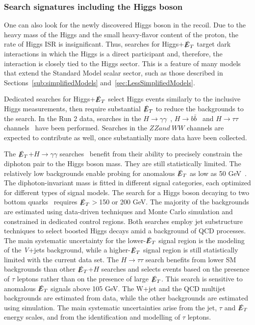 \documentclass{ar-1col}
\newcommand{\MET}{\ensuremath{\slashed{E}_T}\xspace}
\begin{document}
{\subsubsection{Search signatures including the Higgs boson}

One can also look for the newly discovered Higgs boson in the
recoil. Due to the heavy mass of the Higgs and the small
heavy-flavor content of the proton, the rate of Higgs ISR is
insignificant. Thus, searches for Higgs+\MET target dark
interactions in which the Higgs is a direct participant and,
therefore, the interaction is closely tied to the Higgs sector.
This is a feature of many models that extend the Standard Model scalar sector, 
such as those described in Sections~\ref{sub:simplifiedModels} and~\ref{sec:LessSimplifiedModels}. 

Dedicated searches for Higgs+\MET  select Higgs events similarly to
the inclusive Higgs measurements, then require substantial \MET to
reduce the backgrounds to the search. In the Run 2 data, searches
in the $H \rightarrow
\gamma\gamma$~\cite{Sirunyan:2018fpy,Aaboud:2017uak}, $H
\rightarrow b\bar{b}$~\cite{Aaboud:2017yqz,CMS-PAS-EXO-16-050} and $H \rightarrow
\tau\tau$ channels~\cite{Sirunyan:2018fpy} have been
performed. Searches in the $ZZ and~WW$ channels are
expected to contribute as well, once substantially more data have been
collected.

The \MET+$H \rightarrow \gamma\gamma$
searches~\cite{Sirunyan:2018fpy,Aaboud:2017uak} benefit from
their ability to precisely constrain the diphoton pair to the
Higgs boson mass. They are still statistically limited. The
relatively low backgrounds enable probing for anomalous \MET as low
as 50 GeV~\cite{Sirunyan:2018fpy}. The diphoton-invariant mass
is fitted in different signal categories, each optimized for
different types of signal models. The search for a Higgs boson decaying to
two bottom quarks~\cite{Aaboud:2017yqz,CMS-PAS-EXO-16-050} requires \MET$>$150 or 200 GeV.
The majority of the backgrounds are estimated using
data-driven techniques and Monte Carlo simulation and constrained in dedicated control regions. Both searches
employ jet substructure techniques to
select boosted Higgs decays amid a background of QCD processes.
The main systematic uncertainty for the lower-\MET signal region
is the modeling of the \textit{V}+jets background, while a higher-\MET
signal region is still statistically limited with the current
data set. 
The $H \rightarrow \tau\tau$ search benefits from lower SM backgrounds 
than other \MET+$H$ searches and selects events based on the presence 
of $\tau$ leptons rather than on the presence of large \MET. This search 
is sensitive to anomalous \MET signals above 105 GeV. 
The W+jet and the QCD multijet backgrounds are estimated from data,
while the other backgrounds are estimated using simulation. The main
systematic uncertainties arise from the jet, $\tau$ and \MET 
energy scales, and from the identification and modelling of $\tau$ leptons.  

}
\end{document}
